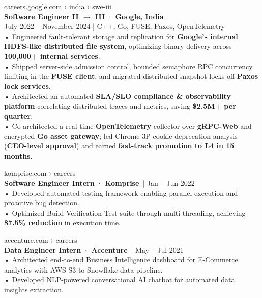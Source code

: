 \documentclass[letterpaper,10pt]{article}
\begin{document}
\begin{minipage}[t]{0.58\textwidth}
\vspace{5pt}

{\selectfont\footnotesize\color{UrlGreen}careers.google.com › india › swe-iii}\\[-2pt]
{\selectfont\color{LinkBlue}\normalsize\bfseries Software Engineer II $\rightarrow$ III} {\normalsize· \textbf{Google, India}}\\[1pt]
{\selectfont\footnotesize\color{SubtleGray}July 2022 -- November 2024 | C++, Go, FUSE, Paxos, OpenTelemetry}\\[2pt]
{\selectfont\small\color{TextBlack}%
• Engineered fault-tolerant storage and replication for \textbf{Google's internal HDFS-like distributed file system}, optimizing binary delivery across \textbf{100,000+ internal services}.\\[1pt]
• Shipped server-side admission control, bounded semaphore RPC concurrency limiting in the \textbf{FUSE client}, and migrated distributed snapshot locks off \textbf{Paxos lock services}.\\[1pt]
• Architected an automated \textbf{SLA/SLO compliance \& observability platform} correlating distributed traces and metrics, saving \textbf{\$2.5M+ per quarter}.\\[1pt]
• Co-architected a real-time \textbf{OpenTelemetry} collector over \textbf{gRPC-Web} and encrypted \textbf{Go asset gateway}; led Chrome 3P cookie deprecation analysis (\textbf{CEO-level approval}) and earned \textbf{fast-track promotion to L4 in 15 months}.%
}

\vspace{5pt}

{\selectfont\footnotesize\color{UrlGreen}komprise.com › careers}\\[-2pt]
{\selectfont\color{LinkBlue}\normalsize\bfseries Software Engineer Intern} {\normalsize· \textbf{Komprise}}~{\footnotesize\color{SubtleGray}| Jan -- Jun 2022}\\[1pt]
{\selectfont\small\color{TextBlack}%
• Developed automated testing framework enabling parallel execution and proactive bug detection.\\[1pt]
• Optimized Build Verification Test suite through multi-threading, achieving \textbf{87.5\% reduction} in execution time.%
}

\vspace{5pt}

{\selectfont\footnotesize\color{UrlGreen}accenture.com › careers}\\[-2pt]
{\selectfont\color{LinkBlue}\normalsize\bfseries Data Engineer Intern} {\normalsize· \textbf{Accenture}}~{\footnotesize\color{SubtleGray}| May -- Jul 2021}\\[1pt]
{\selectfont\small\color{TextBlack}%
• Architected end-to-end Business Intelligence dashboard for E-Commerce analytics with AWS S3 to Snowflake data pipeline.\\[1pt]
• Developed NLP-powered conversational AI chatbot for automated data insights extraction.%
}


\end{minipage}
\end{document}
